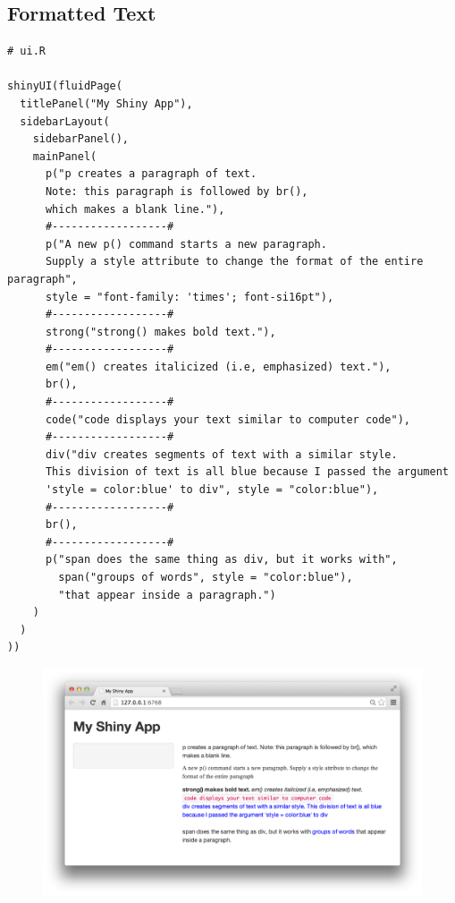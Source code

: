 \documentclass[a4paper,12pt]{article}
\begin{document}
\subsection*{Formatted Text}

\begin{framed}
\begin{verbatim}
# ui.R

shinyUI(fluidPage(
  titlePanel("My Shiny App"),
  sidebarLayout(
    sidebarPanel(),
    mainPanel(
      p("p creates a paragraph of text. 
      Note: this paragraph is followed by br(), 
      which makes a blank line."),
      #------------------#
      p("A new p() command starts a new paragraph. 
      Supply a style attribute to change the format of the entire paragraph", 
      style = "font-family: 'times'; font-si16pt"),
      #------------------#
      strong("strong() makes bold text."),
      #------------------#
      em("em() creates italicized (i.e, emphasized) text."),
      br(),
      #------------------#
      code("code displays your text similar to computer code"),
      #------------------#
      div("div creates segments of text with a similar style. 
      This division of text is all blue because I passed the argument 
      'style = color:blue' to div", style = "color:blue"),
      #------------------#
      br(),
      #------------------#
      p("span does the same thing as div, but it works with",
        span("groups of words", style = "color:blue"),
        "that appear inside a paragraph.")
    )
  )
))
\end{verbatim}
\end{framed}
\newpage

\begin{figure}[h!]
\centering
\includegraphics[width=0.99\linewidth]{./formatting}
\caption{}
\label{fig:formatting}
\end{figure}
\end{document}
